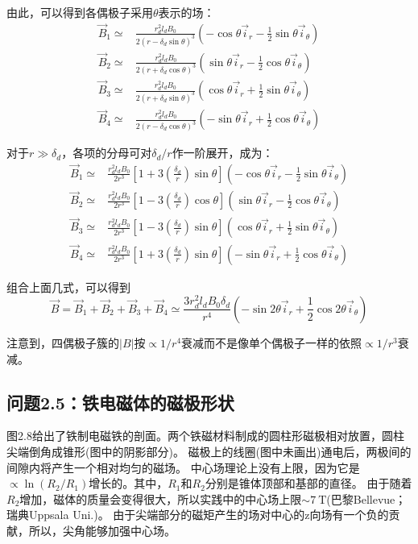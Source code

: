 由此，可以得到各偶极子采用$\theta$表示的场：
\begin{align}
\vec{B}_1 \simeq& \frac{r_d^2 l_d B_0}{2(r-\delta_d\sin\theta)^3}(-\cos\theta \vec{i}_r-\frac{1}{2}\sin\theta \vec{i}_\theta) \nonumber\tag{S4.2a}\\
\vec{B}_2 \simeq& \frac{r_d^2 l_d B_0}{2(r+\delta_d\cos\theta)^3}(\sin\theta \vec{i}_r-\frac{1}{2}\cos\theta \vec{i}_\theta)  \nonumber\tag{S4.2b}\\
\vec{B}_3 \simeq& \frac{r_d^2 l_d B_0}{2(r+\delta_d\sin\theta)^3}(\cos\theta \vec{i}_r+\frac{1}{2}\sin\theta \vec{i}_\theta) \nonumber\tag{S4.2c}\\
\vec{B}_4 \simeq& \frac{r_d^2 l_d B_0}{2(r-\delta_d\cos\theta)^3}(-\sin\theta \vec{i}_r+\frac{1}{2}\cos\theta \vec{i}_\theta)  \nonumber\tag{S4.2d}
\end{align}

对于$r\gg \delta_d$，各项的分母可对$\delta_d/r$作一阶展开，成为：
\begin{align}
\vec{B}_1 \simeq& \frac{r_d^2 l_d B_0}{2 r^3}\left[1+3(\frac{\delta_d}{r})\sin\theta \right](-\cos\theta \vec{i}_r-\frac{1}{2}\sin\theta \vec{i}_\theta)\nonumber\tag{S4.3a}\\
\vec{B}_2 \simeq& \frac{r_d^2 l_d B_0}{2 r^3}\left[1-3(\frac{\delta_d}{r})\cos\theta \right](\sin\theta \vec{i}_r-\frac{1}{2}\cos\theta \vec{i}_\theta)\nonumber\tag{S4.3b}\\
\vec{B}_3 \simeq& \frac{r_d^2 l_d B_0}{2 r^3}\left[1-3(\frac{\delta_d}{r})\sin\theta \right](\cos\theta \vec{i}_r+\frac{1}{2}\sin\theta \vec{i}_\theta)\nonumber\tag{S4.3c}\\
\vec{B}_4 \simeq& \frac{r_d^2 l_d B_0}{2 r^3}\left[1+3(\frac{\delta_d}{r})\sin\theta \right](-\sin\theta \vec{i}_r+\frac{1}{2}\cos\theta \vec{i}_\theta)\nonumber\tag{S4.3d}
\end{align}

组合上面几式，可以得到
\begin{equation*}
\vec{B}=\vec{B}_1+\vec{B}_2+\vec{B}_3+\vec{B}_4\simeq \frac{3r_d^2 l_d B_0 \delta_d}{r^4}(-\sin 2\theta \vec{i}_r+\frac{1}{2}\cos 2\theta \vec{i}_\theta) \tag{2.52}
\end{equation*}

注意到，四偶极子簇的$|B|$按$\propto 1/r^4$衰减而不是像单个偶极子一样的依照$\propto 1/r^3$衰减。



\subsection{问题2.5：铁电磁体的磁极形状}
图2.8给出了铁制电磁铁的剖面。两个铁磁材料制成的圆柱形磁极相对放置，圆柱尖端倒角成锥形(图中的阴影部分)。
磁极上的线圈(图中未画出)通电后，两极间的间隙内将产生一个相对均匀的磁场。
中心场理论上没有上限，因为它是$\propto \ln(R_2/R_1)$增长的。其中，$R_1$和$R_2$分别是锥体顶部和基部的直径。
由于随着$R_2$增加，磁体的质量会变得很大，所以实践中的中心场上限$\sim 7\ \mathrm{T}$(巴黎Bellevue；瑞典Uppsala Uni.)。
由于尖端部分的磁矩产生的场对中心的z向场有一个负的贡献，所以，尖角能够加强中心场。

